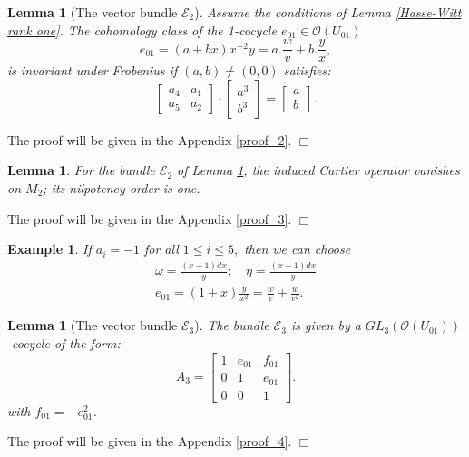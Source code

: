 \documentclass[12pt,a4]{amsart}
\newtheorem{lem}[claim]{Lemma}
\newtheorem{example}[claim]{Example}
\theoremstyle{definition}
\begin{document}
  
\begin{lem}[The vector bundle $\mathcal E_2$] \label{lem_E2}
Assume the conditions of Lemma \ref{Hasse-Witt rank one}.
The cohomology class of the 1-cocycle $e_{01} \in \mathcal{O}(U_{01})$  
\begin{equation} \label{e} e_{01} = ( a + bx)x^{-2}y = a.\frac{w}{v} +b.\frac{y}{x}, \end{equation}
is invariant under Frobenius if $(a,b)\ne(0,0)$ satisfies:
\begin{equation} \label{e01} 
\begin{bmatrix}
	a_4 & a_1 \\ a_5 & a_2
\end{bmatrix} \cdot \begin{bmatrix}
a^3 \\ b^3
\end{bmatrix} = \begin{bmatrix}
a \\ b
\end{bmatrix}.
\end{equation}\end{lem}
\noindent The proof will be given in the Appendix \ref{proof_2}. \hfill $\Box$

\begin{lem}\label{lemma 3.7}
For the bundle $\mathcal E_2$ of Lemma \ref{lem_E2}, the induced
Cartier operator vanishes on $M_2$; its nilpotency order is one.  
\end{lem}
\noindent The proof will be given in the Appendix \ref{proof_3}. \hfill $\Box$

\begin{example}
	If $a_i = -1$ for all $1 \leq i \leq 5,$ then we can choose
	\begin{align*}
		\omega  = \frac{(x-1)dx}{y}; \quad  \eta  = \frac{(x+1)dx}{y}\\
		e_{01} = (1+x)\frac{y}{x^2} = \frac{w}{v} + \frac{w}{v^2}.
	\end{align*}
\end{example}

\begin{lem}[The vector bundle $\mathcal E_3$]\label{lem_E3}
The bundle $\mathcal E_3$ is given by a $GL_3(\mathcal{O}(U_{01}))$-cocycle of the form:
\begin{equation*}
A_3= \begin{bmatrix}
1 & e_{01} & f_{01} \\  0 & 1 & e_{01} \\ 0 & 0 & 1
\end{bmatrix}.
\end{equation*}with $f_{01} = -e_{01}^2$. \end{lem}
\noindent The proof will be given in the Appendix \ref{proof_4}. \hfill $\Box$
\end{document}

